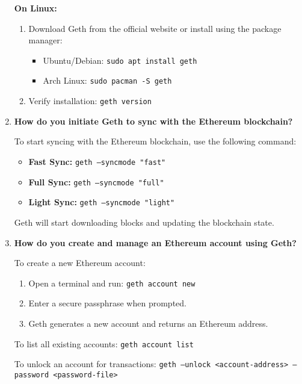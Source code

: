 \documentclass[11pt]{article}
\begin{document}
\begin{enumerate}
    \textbf{On Linux:}
    \begin{enumerate}
        \item Download Geth from the official website or install using the package manager:
        \begin{itemize}
            \item Ubuntu/Debian: \texttt{sudo apt install geth}
            \item Arch Linux: \texttt{sudo pacman -S geth}
        \end{itemize}
        \item Verify installation: \texttt{geth version}
    \end{enumerate}

    \item \textbf{How do you initiate Geth to sync with the Ethereum blockchain?}
    
    To start syncing with the Ethereum blockchain, use the following command:

    \begin{itemize}
        \item \textbf{Fast Sync:}  
        \texttt{geth --syncmode "fast"}
        \item \textbf{Full Sync:}  
        \texttt{geth --syncmode "full"}
        \item \textbf{Light Sync:}  
        \texttt{geth --syncmode "light"}
    \end{itemize}

    Geth will start downloading blocks and updating the blockchain state.

    \item \textbf{How do you create and manage an Ethereum account using Geth?}
    
    To create a new Ethereum account:
    \begin{enumerate}
        \item Open a terminal and run:  
        \texttt{geth account new}
        \item Enter a secure passphrase when prompted.
        \item Geth generates a new account and returns an Ethereum address.
    \end{enumerate}

    To list all existing accounts:  
    \texttt{geth account list}

    To unlock an account for transactions:  
    \texttt{geth --unlock <account-address>
     --password <password-file>}


\end{enumerate}
\end{document}
